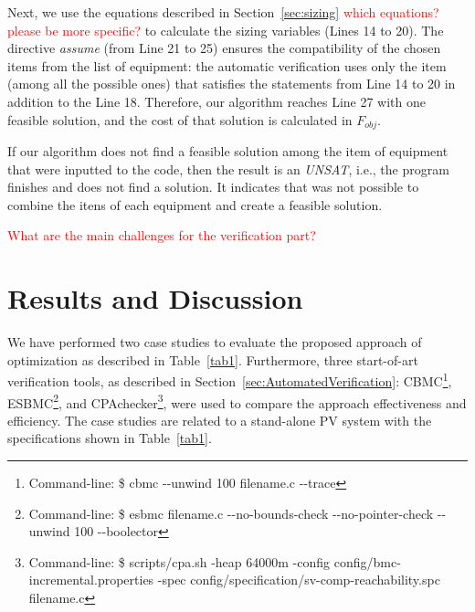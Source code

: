 \documentclass[10pt,conference]{IEEEtran}
\begin{document}
Next, we use the equations described in Section~\ref{sec:sizing} \textcolor{red}{which equations? please be more specific?} to calculate the sizing variables (Lines 14 to 20). The directive \textit{assume} (from Line 21 to 25) ensures the compatibility of the chosen items from the list of equipment: the automatic verification uses only the item (among all the possible ones) that satisfies the statements from Line 14 to 20 in addition to the Line 18. Therefore, our algorithm reaches Line 27 with one feasible solution, and the cost of that solution is calculated in $F_{obj}$.

If our algorithm does not find a feasible solution among the item of equipment that were inputted to the code, then the result is an \textit{UNSAT}, i.e., the program finishes and does not find a solution. It indicates that was not possible to combine the itens of each equipment and create a feasible solution.

\textcolor{red}{What are the main challenges for the verification part?}

\section{Results and Discussion}

We have performed two case studies to evaluate the proposed approach of optimization as described in Table~\ref{tab1}. Furthermore, three start-of-art verification tools, as described in Section~\ref{sec:AutomatedVerification}: CBMC\footnote{Command-line: \$ cbmc -\phantom{}-unwind 100 filename.c -\phantom{}-trace}, ESBMC\footnote{Command-line: \$ esbmc filename.c -\phantom{}-no-bounds-check -\phantom{}-no-pointer-check -\phantom{}-unwind 100 -\phantom{}-boolector}, %
and CPAchecker\footnote{Command-line: \$ scripts/cpa.sh -heap 64000m -config config/bmc-incremental.properties -spec config/specification/sv-comp-reachability.spc filename.c}, were used to compare the approach effectiveness and efficiency. The case studies are related to a stand-alone PV system with the specifications shown in Table~\ref{tab1}.
\end{document}
